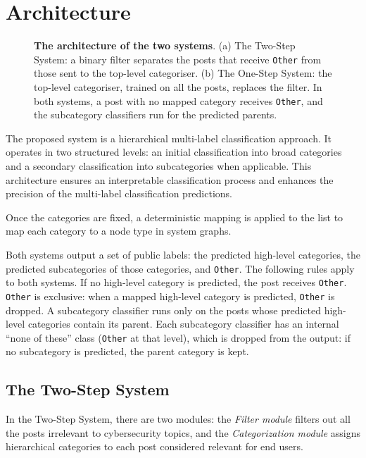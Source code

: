 \section{Architecture}\label{sec:architecture}
\begin{figure}
    \centering
    
    \caption{\textbf{The architecture of the two systems}. (a) The Two-Step System: a binary filter separates the posts that receive \texttt{Other} from those sent to the top-level categoriser. (b) The One-Step System: the top-level categoriser, trained on all the posts, replaces the filter. In both systems, a post with no mapped category receives \texttt{Other}, and the subcategory classifiers run for the predicted parents.}
    \label{fig:system-architecture}
\end{figure}

The proposed system is a hierarchical multi-label classification approach. It operates in two structured levels: an initial classification into broad categories and a secondary classification into subcategories when applicable. This architecture ensures an interpretable classification process and enhances the precision of the multi-label classification predictions.

Once the categories are fixed, a deterministic mapping is applied to the list to map each category to a node type in system graphs.

Both systems output a set of public labels: the predicted high-level categories, the predicted subcategories of those categories, and \texttt{Other}. The following rules apply to both systems. If no high-level category is predicted, the post receives \texttt{Other}. \texttt{Other} is exclusive: when a mapped high-level category is predicted, \texttt{Other} is dropped. A subcategory classifier runs only on the posts whose predicted high-level categories contain its parent. Each subcategory classifier has an internal ``none of these'' class (\texttt{Other} at that level), which is dropped from the output: if no subcategory is predicted, the parent category is kept.

\subsection{The Two-Step System}\label{subsec:two-step-system-mth}
In the Two-Step System, there are two modules: the \textit{Filter module} filters out all the posts irrelevant to cybersecurity topics, and the \textit{Categorization module} assigns hierarchical categories to each post considered relevant for end users.

